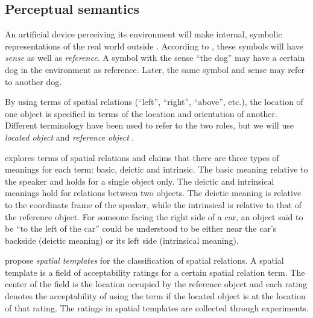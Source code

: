 \subsection{Perceptual semantics}

An artificial device perceiving its environment will make internal, symbolic representations of the real world outside \citep{PustejovskyPerceptualsemanticsconstruction1990}.
According to \cite{FregeUberSinnUnd1892}, these symbols will have \textit{sense} as well as \textit{reference}.
A symbol with the sense ``the dog'' may have a certain dog in the environment as reference.
Later, the same symbol and sense may refer to another dog.

By using terms of spatial relations (``left'', ``right'', ``above'', etc.), the location of one object is specified in terms of the location and orientation of another.
Different terminology have been used to refer to the two roles, but we will use \textit{located object} and \textit{reference object} \citep{DobnikModellinglanguageaction2012}.

\cite{Garnhamunifiedtheorymeaning1989} explores terms of spatial relations and claims that there are three types of meanings for each term: basic, deictic and intrinsic.
The basic meaning relative to the speaker and holds for a single object only.
The deictic and intrinsical meanings hold for relations between two objects.
The deictic meaning is relative to the coordinate frame of the speaker, while the intrinsical is relative to that of the reference object.
For someone facing the right side of a car, an object said to be ``to the left of the car'' could be understood to be either near the car's backside (deictic meaning) or its left side (intrinsical meaning).


\cite{LoganComputationalAnalysisApprehension1996} propose \textit{spatial templates} for the classification of spatial relations.
A spatial template is a field of acceptability ratings for a certain spatial relation term.
The center of the field is the location occupied by the reference object and each rating denotes the acceptability of using the term if the located object is at the location of that rating.
The ratings in spatial templates are collected through experiments.

